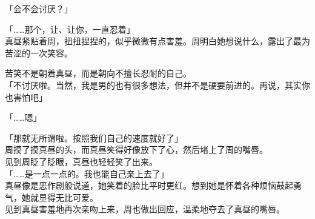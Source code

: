 「会不会讨厌？」

「……那个，让、让你，一直忍着」\\

真昼紧贴着周，扭扭捏捏的，似乎微微有点害羞。周明白她想说什么，露出了最为苦涩的一次笑容。

苦笑不是朝着真昼，而是朝向不擅长忍耐的自己。\\

「不讨厌啦。当然，我是男的也有很多想法，但并不是硬要前进的。再说，其实你也害怕吧」

「……嗯」

「那就无所谓啦。按照我们自己的速度就好了」\\

周摸了摸真昼的头，而真昼笑得好像放下了心，然后堵上了周的嘴唇。\\

见到周眨了眨眼，真昼也轻轻笑了出来。\\

「……是一点一点的。我也能自己亲上去了」\\

真昼像是恶作剧般说道，她笑着的脸比平时更红。想到她是怀着各种烦恼鼓起勇气，她就显得无比可爱。\\

见到真昼害羞地再次亲吻上来，周也做出回应，温柔地夺去了真昼的嘴唇。

